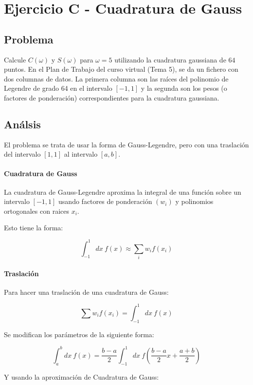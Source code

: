 \section{Ejercicio C - Cuadratura de Gauss}


\subsection{Problema}

Calcule $C(\omega)$ y $S(\omega)$ para $\omega = 5$ utilizando la cuadratura gaussiana de $64$ puntos. En el Plan de Trabajo del curso virtual (Tema 5), se da un fichero con dos columnas de datos. La primera columna son las raíces del polinomio de Legendre de grado 64 en el intervalo $[-1, 1]$ y la segunda son los pesos (o factores de ponderación) correspondientes para la cuadratura gaussiana.

\subsection{Análsis}

El problema se trata de usar la forma de Gauss-Legendre, pero con una traslación del intervalo $[1, 1]$ al intervalo $[a, b]$.

\paragraph{Cuadratura de Gauss}

La cuadratura de Gauss-Legendre aproxima la integral de una función sobre un intervalo $[-1, 1]$ usando factores de ponderación $(w_i)$ y polinomios ortogonales con raices $x_i$.

Esto tiene la forma:

$$
\int_{-1}^{1} dx ~ f(x) 
\approx \sum_{i} w_i f(x_i)
$$


\paragraph{Traslación}
Para hacer una traslación de una cuadratura de Gauss:

$$ \sum w_i f(x_i) = \int_{-1}^{1} dx ~ f(x) $$ 

Se modifican los parámetros de la siguiente forma: 

$$
\int_{a}^{b}dx~ f(x) = \frac{b - a}{2} \int_{-1}^{1} dx ~ f( \frac{b-a}{2} x + \frac{a + b}{2})
$$

Y usando la aproximación de Cuadratura de Gauss:

